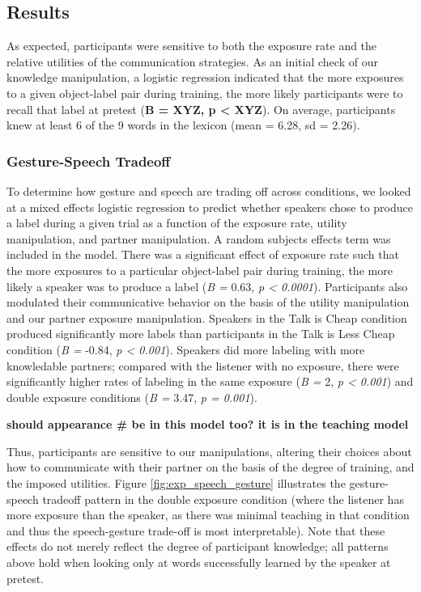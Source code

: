 \documentclass[10pt, letterpaper]{article}
\begin{document}
\subsection{Results}\label{results-1}

As expected, participants were sensitive to both the exposure rate and
the relative utilities of the communication strategies. As an initial
check of our knowledge manipulation, a logistic regression indicated
that the more exposures to a given object-label pair during training,
the more likely participants were to recall that label at pretest
(\textbf{B = XYZ, p \textless{} XYZ}). On average, participants knew at
least 6 of the 9 words in the lexicon (mean = 6.28, sd = 2.26).

\subsubsection{Gesture-Speech Tradeoff}\label{gesture-speech-tradeoff}

To determine how gesture and speech are trading off across conditions,
we looked at a mixed effects logistic regression to predict whether
speakers chose to produce a label during a given trial as a function of
the exposure rate, utility manipulation, and partner manipulation. A
random subjects effects term was included in the model. There was a
significant effect of exposure rate such that the more exposures to a
particular object-label pair during training, the more likely a speaker
was to produce a label (\emph{B =} 0.63, \emph{p \textless{} 0.0001}).
Participants also modulated their communicative behavior on the basis of
the utility manipulation and our partner exposure manipulation. Speakers
in the Talk is Cheap condition produced significantly more labels than
participants in the Talk is Less Cheap condition (\emph{B =} -0.84,
\emph{p \textless{} 0.001}). Speakers did more labeling with more
knowledable partners; compared with the listener with no exposure, there
were significantly higher rates of labeling in the same exposure
(\emph{B =} 2, \emph{p \textless{} 0.001}) and double exposure
conditions (\emph{B =} 3.47, \emph{p = 0.001}).

\textbf{should appearance \# be in this model too? it is in the teaching
model}

Thus, participants are sensitive to our manipulations, altering their
choices about how to communicate with their partner on the basis of the
degree of training, and the imposed utilities. Figure
\ref{fig:exp_speech_gesture} illustrates the gesture-speech tradeoff
pattern in the double exposure condition (where the listener has more
exposure than the speaker, as there was minimal teaching in that
condition and thus the speech-gesture trade-off is most interpretable).
Note that these effects do not merely reflect the degree of participant
knowledge; all patterns above hold when looking only at words
successfully learned by the speaker at pretest.
\end{document}
